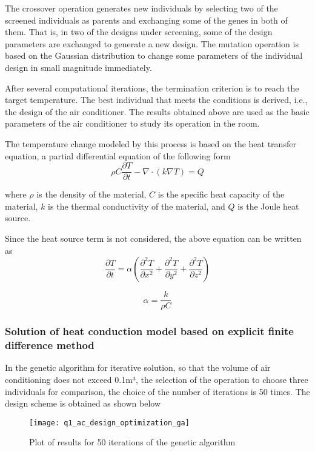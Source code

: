 \documentclass{apmcmthesis}
\begin{document}
The crossover operation generates new individuals by selecting two of the screened individuals as parents and exchanging some of the genes in both of them. That is, in two of the designs under screening, some of the design parameters are exchanged to generate a new design. The mutation operation is based on the Gaussian distribution to change some parameters of the individual design in small magnitude immediately.

After several computational iterations, the termination criterion is to reach the target temperature. The best individual that meets the conditions is derived, i.e., the design of the air conditioner. The results obtained above are used as the basic parameters of the air conditioner to study its operation in the room.

The temperature change modeled by this process is based on the heat transfer equation, a partial differential equation of the following form
\begin{equation}
	\rho C\frac{{\partial T}}{{\partial t}} - \nabla  \cdot \left( {k\nabla T} \right) = Q
\end{equation}

where $\rho $ is the density of the material, $C$ is the specific heat capacity of the material, $k$ is the thermal conductivity of the material, and $Q$ is the Joule heat source.

Since the heat source term  is not considered, the above equation can be written as
\begin{equation}
	\frac{{\partial T}}{{\partial t}} = \alpha \left( {\frac{{{\partial ^2}T}}{{\partial {x^2}}} + \frac{{{\partial ^2}T}}{{\partial {y^2}}} + \frac{{{\partial ^2}T}}{{\partial {z^2}}}} \right)
\end{equation}

\begin{equation}
	\alpha  = \frac{k}{{\rho C}}
\end{equation}

\subsubsection{Solution of heat conduction model based on explicit finite difference method}
In the genetic algorithm for iterative solution, so that the volume of air conditioning does not exceed 0.1m³, the selection of the operation to choose three individuals for comparison, the choice of the number of iterations is 50 times. The design scheme is obtained as shown below
\begin{figure}[H]
	\centering
	\texttt{[image: q1\_ac\_design\_optimization\_ga]}%
	\caption{Plot of results for 50 iterations of the genetic algorithm} %
\end{figure}
\end{document}
